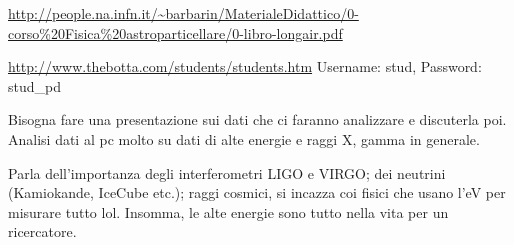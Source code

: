\documentclass[main.tex]{subfiles}
\begin{document}
\url{http://people.na.infn.it/~barbarin/MaterialeDidattico/0-corso%20Fisica%20astroparticellare/0-libro-longair.pdf}

\url{http://www.thebotta.com/students/students.htm}
Username: stud, Password: stud_pd

Bisogna fare una presentazione sui dati che ci faranno analizzare e discuterla poi. Analisi dati al pc molto su dati di alte energie e raggi X, gamma in generale.

Parla dell'importanza degli interferometri LIGO e VIRGO; dei neutrini (Kamiokande, IceCube etc.); raggi cosmici, si incazza coi fisici che usano l'eV per misurare tutto lol. Insomma, le alte energie sono tutto nella vita per un ricercatore.
\end{document}
